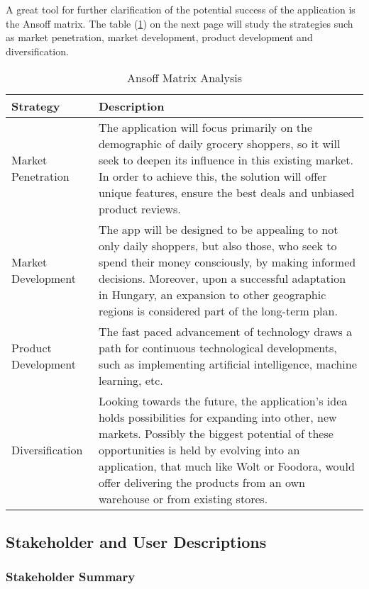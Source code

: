 A great tool for further clarification of the potential success of the application is the Ansoff matrix. The table (\ref{tab:ansoff}) on the next page will study the strategies such as market penetration, market development, product development and diversification.

\begin{table}[h]
	\centering
	\begin{tabularx}{\textwidth}{|p{3.7cm}|X|}
		\hline
		\textbf{Strategy} & \textbf{Description} \\
		\hline
		Market Penetration & The application will focus primarily on the demographic of daily grocery shoppers, so it will seek to deepen its influence in this existing market. In order to achieve this, the solution will offer unique features, ensure the best deals and unbiased product reviews. \\
		\hline
		Market Development & The app will be designed to be appealing to not only daily shoppers, but also those, who seek to spend their money consciously, by making informed decisions. Moreover, upon a successful adaptation in Hungary, an expansion to other geographic regions is considered part of the long-term plan. \\
		\hline
		Product Development & The fast paced advancement of technology draws a path for continuous technological developments, such as implementing artificial intelligence, machine learning, etc.\\
		\hline
		Diversification & Looking towards the future, the application's idea holds possibilities for expanding into other, new markets. Possibly the biggest potential of these opportunities is held by evolving into an application, that much like Wolt or Foodora, would offer delivering the products from an own warehouse or from existing stores. \\
		\hline
	\end{tabularx}
	\caption{Ansoff Matrix Analysis}
	\label{tab:ansoff}
\end{table}


\pagebreak

\subsection{Stakeholder and User Descriptions}

\subsubsection{Stakeholder Summary}

